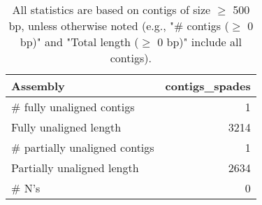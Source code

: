 \documentclass[12pt,a4paper]{article}
\begin{document}
\begin{table}[ht]
\begin{center}
\caption{All statistics are based on contigs of size $\geq$ 500 bp, unless otherwise noted (e.g., "\# contigs ($\geq$ 0 bp)" and "Total length ($\geq$ 0 bp)" include all contigs).}
\begin{tabular}{|l*{1}{|r}|}
\hline
Assembly & contigs\_spades \\ \hline
\# fully unaligned contigs & 1 \\ \hline
Fully unaligned length & 3214 \\ \hline
\# partially unaligned contigs & 1 \\ \hline
Partially unaligned length & 2634 \\ \hline
\# N's & 0 \\ \hline
\end{tabular}
\end{center}
\end{table}
\end{document}
